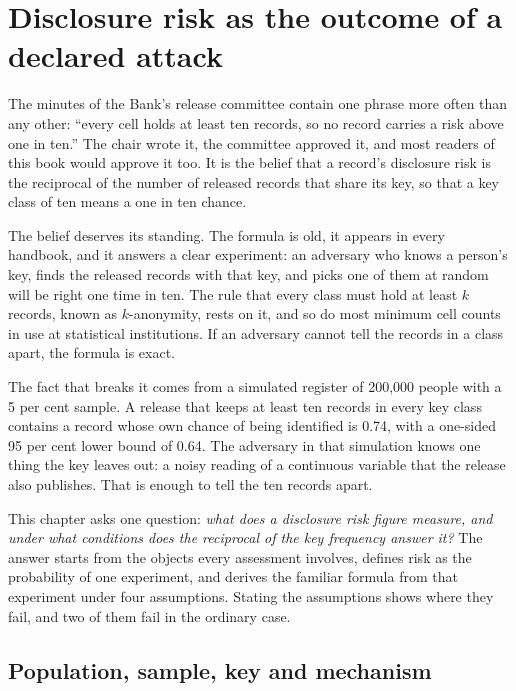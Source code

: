 \chapter{Disclosure risk as the outcome of a declared attack}\label{ch:scenario}

The minutes of the Bank's release committee contain one phrase more often than any other:
``every cell holds at least ten records, so no record carries a risk above one in ten.''
The chair wrote it, the committee approved it, and most readers of this book would approve it
too. It is the belief that a record's disclosure risk is the reciprocal of the number of
released records that share its key, so that a key class of ten means a one in ten chance.

The belief deserves its standing. The formula is old, it appears in every handbook, and it
answers a clear experiment: an adversary who knows a person's key, finds the released records
with that key, and picks one of them at random will be right one time in ten. The rule that
every class must hold at least $k$ records, known as $k$-anonymity, rests on it, and so do
most minimum cell counts in use at statistical institutions. If an adversary cannot tell the
records in a class apart, the formula is exact.

The fact that breaks it comes from a simulated register of 200,000 people with a 5 per cent
sample. A release that keeps at least ten records in every key class contains a record whose
own chance of being identified is 0.74, with a one-sided 95 per cent lower bound of 0.64.
The adversary in that simulation knows one thing the key leaves out: a noisy reading of a
continuous variable that the release also publishes. That is enough to tell the ten records
apart.

This chapter asks one question: \emph{what does a disclosure risk figure measure, and under
what conditions does the reciprocal of the key frequency answer it?} The answer starts from
the objects every assessment involves, defines risk as the probability of one experiment, and
derives the familiar formula from that experiment under four assumptions. Stating the
assumptions shows where they fail, and two of them fail in the ordinary case.

\section{Population, sample, key and mechanism}

